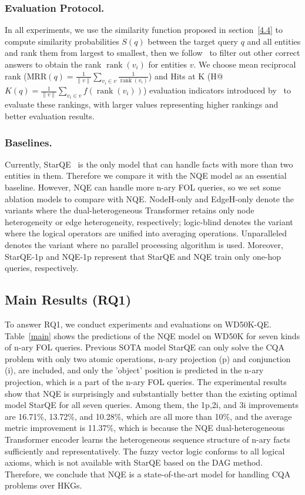 \documentclass[letterpaper]{article} \usepackage{aaai23}  \usepackage{times}  \usepackage{helvet}  \usepackage{courier}  \usepackage[hyphens]{url}  \usepackage{graphicx} \urlstyle{rm} \def\UrlFont{\rm}  \usepackage{natbib}  \usepackage{caption} \frenchspacing  \setlength{\pdfpagewidth}{8.5in}  \setlength{\pdfpageheight}{11in}  \usepackage{algorithm}
\begin{document}
\subsubsection{Evaluation Protocol.}
In all experiments, we use the similarity function proposed in section~\ref{4.4} to compute similarity probabilities $S(q)$ between the target query $q$ and all entities and rank them from largest to smallest, then we follow~\citet{TransE} to filter out other correct answers to obtain the rank $\operatorname{rank} \left(v_{i}\right)$ for entities $v$. We choose mean reciprocal rank (MRR$(q)=\frac{1}{\|v\|} \sum_{v_{i} \in v} \frac{1}{\operatorname{rank}\left(v_{i}\right)}$) and Hits at K (H@$K(q)=\frac{1}{\|v\|} \sum_{v_{i} \in v} f\left(\operatorname {rank}\left(v_{i}\right)\right)$) evaluation indicators introduced by~\citet{TransE} to evaluate these rankings, with larger values representing higher rankings and better evaluation results.
\subsubsection{Baselines.}
Currently, StarQE~\citep{StarQE} is the only model that can handle facts with more than two entities in them. Therefore we compare it with the NQE model as an essential baseline. However, NQE can handle more n-ary FOL queries, so we set some ablation models to compare with NQE. NodeH-only and EdgeH-only denote the variants where the dual-heterogeneous Transformer retains only node heterogeneity or edge heterogeneity, respectively; logic-blind denotes the variant where the logical operators are unified into averaging operations. Unparalleled denotes the variant where no parallel processing algorithm is used. Moreover, StarQE-1p and NQE-1p represent that StarQE and NQE train only one-hop queries, respectively.

\subsection{Main Results (RQ1)} 
To answer RQ1, we conduct experiments and evaluations on WD50K-QE. Table~\ref{main} shows the predictions of the NQE model on WD50K for seven kinds of n-ary FOL queries. Previous SOTA model StarQE can only solve the CQA problem with only two atomic operations, n-ary projection (p) and conjunction (i), are included, and only the 'object' position is predicted in the n-ary projection, which is a part of the n-ary FOL queries. The experimental results show that NQE is surprisingly and substantially better than the existing optimal model StarQE for all seven queries. Among them, the 1p,2i, and 3i improvements are 16.71\%, 13.72\%, and 10.28\%, which are all more than 10\%, and the average metric improvement is 11.37\%, which is because the NQE dual-heterogeneous Transformer encoder learns the heterogeneous sequence structure of n-ary facts sufficiently and representatively. The fuzzy vector logic conforms to all logical axioms, which is not available with StarQE based on the DAG method. Therefore, we conclude that NQE is a state-of-the-art model for handling CQA problems over HKGs.
\end{document}
